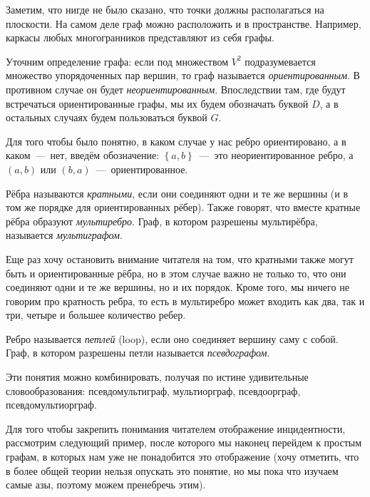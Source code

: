 	Заметим, что нигде не было сказано, что точки должны располагаться на плоскости. На самом деле граф 
	можно расположить и в пространстве. Например, каркасы любых многогранников представляют из себя графы.

	Уточним определение графа: если под множеством $V^2$ подразумевается множество упорядоченных пар вершин, то граф 
	называется \emph{ориентированным}. В противном случае он будет \emph{неориентированным}. Впоследствии там, где будут встречаться 
	ориентированные графы, мы их будем обозначать буквой $D$, а в остальных случаях будем пользоваться буквой $G$.

	Для того чтобы было понятно, в каком случае у нас ребро ориентировано, а в каком~---~нет, введём обозначение: 
	$\left\lbrace a, b \right\rbrace$~---~это неориентированное ребро, а $(a, b)$ или $(b, a)$~---~ориентированное.
	
\begin{definition}
	Рёбра называются \emph{кратными}, если они соединяют одни и те же вершины (и в том же порядке для ориентированных рёбер). 
	Также говорят, что вместе кратные рёбра образуют \emph{мультиребро}. Граф, в котором разрешены мультирёбра, называется \emph{мультиграфом}.
\end{definition}

	Еще раз хочу остановить внимание читателя на том, что кратными также могут быть и ориентированные рёбра, но в этом случае 
	важно не только то, что они соединяют одни и те же вершины, но и их порядок. Кроме того, мы ничего не говорим 
	про кратность ребра, то есть в мультиребро может входить как два, так и три, четыре и большее количество ребер.

\begin{definition}
	Ребро называется \emph{петлей} (loop), если оно соединяет вершину саму с собой. 
	Граф, в котором разрешены петли называется \emph{псевдографом}.
\end{definition}

	Эти понятия можно комбинировать, получая по истине удивительные словообразования: 
	псевдомультиграф, мультиорграф, псевдоорграф, псевдомультиорграф.

	Для того чтобы закрепить понимания читателем отображение инцидентности, рассмотрим следующий пример, после которого 
	мы наконец перейдем к простым графам, в которых нам уже не понадобится это отображение (хочу отметить, что в более 
	общей теории нельзя опускать это понятие, но мы пока что изучаем самые азы, поэтому можем пренебречь этим).

